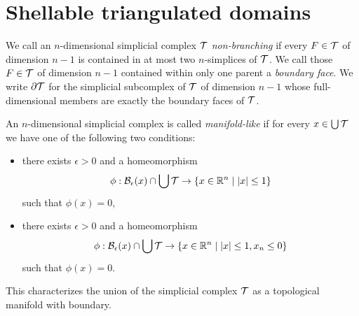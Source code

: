 \documentclass[a4paper]{amsart}
\begin{document}


























\newpage

\section{Shellable triangulated domains}\label{section:shellable}

We call an $n$-dimensional simplicial complex ${\mathcal T}$ \emph{non-branching} if every $F \in {\mathcal T}$ of dimension $n-1$ is contained in at most two $n$-simplices of ${\mathcal T}$. We call those $F \in {\mathcal T}$ of dimension $n-1$ contained within only one parent a \emph{boundary face}.
We write $\partial{\mathcal T}$ for the simplicial subcomplex of ${\mathcal T}$ of dimension $n-1$ 
whose full-dimensional members are exactly the boundary faces of ${\mathcal T}$.

An $n$-dimensional simplicial complex is called \emph{manifold-like} if for every $x \in \bigcup {\mathcal T}$
we have one of the following two conditions:
\begin{itemize}
 \item 
 there exists $\epsilon > 0$ 
 and a homeomorphism 
 \begin{align*}
    \phi : \Ball_\epsilon(x) \cap \bigcup\calT  
    \rightarrow 
    \left\{ x \in \bbR^{n} \suchthat |x| \leq 1 \right\}
 \end{align*}
 such that $\phi(x) = 0$,
 \item 
 there exists $\epsilon > 0$ and a homeomorphism 
 \begin{align*}
    \phi : \Ball_\epsilon(x) \cap \bigcup\calT 
    \rightarrow 
    \left\{ x \in \bbR^{n} \suchthat |x| \leq 1, x_n \leq 0 \right\}
 \end{align*}
 such that $\phi(x) = 0$.
\end{itemize}
This characterizes the union of the simplicial complex ${\mathcal T}$ as a topological manifold with boundary. 
\end{document}
